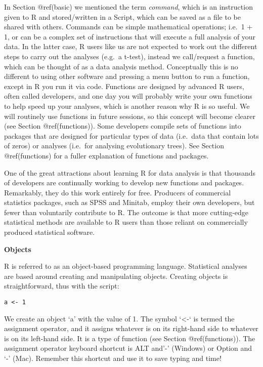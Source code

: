 \documentclass[
]{book}
\begin{document}
In Section @ref(basic) we mentioned the term \emph{command}, which is an
instruction given to R and stored/written in a Script, which can be
saved as a file to be shared with others. Commands can be simple
mathematical operations; i.e.~1 + 1, or can be a complex set of
instructions that will execute a full analysis of your data. In the
latter case, R users like us are not expected to work out the different
steps to carry out the analyses (e.g.~a t-test), instead we call/request
a function, which can be thought of as a data analysis method.
Conceptually this is no different to using other software and pressing a
menu button to run a function, except in R you run it via code.
Functions are designed by advanced R users, often called developers, and
one day you will probably write your own functions to help speed up your
analyses, which is another reason why R is so useful. We will routinely
use functions in future sessions, so this concept will become clearer
(see Section @ref(functions)). Some developers compile sets of functions
into packages that are designed for particular types of data (i.e.~data
that contain lots of zeros) or analyses (i.e.~for analysing evolutionary
trees). See Section @ref(functions) for a fuller explanation of
functions and packages.

One of the great attractions about learning R for data analysis is that
thousands of developers are continually working to develop new functions
and packages. Remarkably, they do this work entirely for free. Producers
of commercial statistics packages, such as SPSS and Minitab, employ
their own developers, but fewer than voluntarily contribute to R. The
outcome is that more cutting-edge statistical methods are available to R
users than those reliant on commercially produced statistical software.

\textbf{Objects}

R is referred to as an object-based programming language. Statistical
analyses are based around creating and manipulating objects. Creating
objects is straightforward, thus with the script:

\texttt{a\ \textless{}-\ 1}

We create an object `a' with the value of 1. The symbol `\textless-` is
termed the assignment operator, and it assigns whatever is on its
right-hand side to whatever is on its left-hand side. It is a type of
function (see Section @ref(functions)). The assignment operator keyboard
shortcut is ALT and'-' (Windows) or Option and `-' (Mac). Remember this
shortcut and use it to save typing and time!
\end{document}
